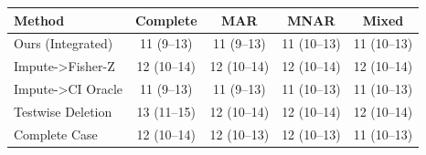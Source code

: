 \begin{tabular}{lcccc}
\toprule
Method & Complete & MAR & MNAR & Mixed \\
\midrule
Ours (Integrated) & 11 (9--13) & 11 (9--13) & 11 (10--13) & 11 (10--13) \\
Impute->Fisher-Z & 12 (10--14) & 12 (10--14) & 12 (10--14) & 12 (10--14) \\
Impute->CI Oracle & 11 (9--13) & 11 (9--13) & 11 (10--13) & 11 (10--13) \\
Testwise Deletion & 13 (11--15) & 12 (10--14) & 12 (10--14) & 12 (10--14) \\
Complete Case & 12 (10--14) & 12 (10--13) & 12 (10--13) & 11 (10--13) \\
\bottomrule
\end{tabular}